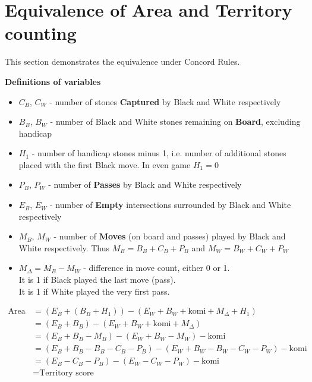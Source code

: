 \documentclass[11pt]{article}
\begin{document}
\newpage
\section{Equivalence of Area and Territory counting}

This section demonstrates the equivalence under Concord Rules.

\textbf{Definitions of variables}

\begin{itemize}
\item $C_B$, $C_W$ - number of stones \textbf{Captured} by Black and White respectively
\item $B_B$, $B_W$ - number of Black and White stones remaining on \textbf{Board}, excluding handicap
\item $H_1$ - number of handicap stones minus 1, i.e. number of additional stones placed with the first Black move.
In even game $H_1 = 0$
\item $P_B$, $P_W$ - number of \textbf{Passes} by Black and White respectively
\item $E_B$, $E_W$ - number of \textbf{Empty} intersections surrounded by Black and White respectively
\item $M_B$, $M_W$ - number of \textbf{Moves} (on board and passes) played by Black and White respectively.
Thus $M_B = B_B + C_B + P_B$ and $M_W = B_W + C_W + P_W$
\item $M_\Delta = M_B - M_W$ - difference in move count, either 0 or 1. \\
It is 1 if Black played the last move (pass).\\
It is 1 if White played the very first pass.
\end{itemize}

\begin{align}
\text{Area score} &= (E_B + (B_B+H_1)) - (E_W + B_W + \text{komi} + M_\Delta + H_1) \\
&= (E_B + B_B) - (E_W + B_W + \text{komi} + M_\Delta) \\
&= (E_B + B_B - M_B) - (E_W + B_W - M_W) - \text{komi} \\
&= (E_B + B_B - B_B - C_B - P_B ) - (E_W + B_W - B_W - C_W - P_W) - \text{komi} \\
&= (E_B - C_B - P_B) - (E_W - C_W - P_W) - \text{komi} \\
&= \text{Territory score}
\end{align}
\end{document}
